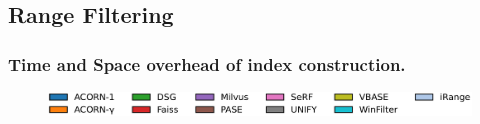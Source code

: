\documentclass[sigconf, nonacm]{acmart}
\begin{document}
	\subsection{Range Filtering}
	
	\subsubsection{Time and Space overhead of index construction.}
	
	\begin{figure}[t]
		\centering
		
		
		\hspace*{5pt}
		\includegraphics[width=0.98\columnwidth]{figures/indexData/rangeFilter_legend_only.pdf}
		
		

\end{figure}
\end{document}
